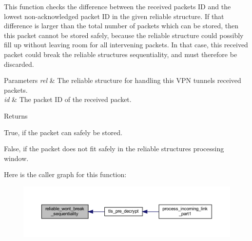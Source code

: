 This function checks the difference between the received packet\textquotesingle{}s I\+D and the lowest non-\/acknowledged packet I\+D in the given reliable structure. If that difference is larger than the total number of packets which can be stored, then this packet cannot be stored safely, because the reliable structure could possibly fill up without leaving room for all intervening packets. In that case, this received packet could break the reliable structure\textquotesingle{}s sequentiality, and must therefore be discarded.


\begin{DoxyParams}{Parameters}
{\em rel} & The reliable structure for handling this V\+P\+N tunnel\textquotesingle{}s received packets. \\
\hline
{\em id} & The packet I\+D of the received packet.\\
\hline
\end{DoxyParams}
\begin{DoxyReturn}{Returns}
\begin{DoxyItemize}
\item True, if the packet can safely be stored. \item False, if the packet does not fit safely in the reliable structure\textquotesingle{}s processing window. \end{DoxyItemize}

\end{DoxyReturn}


Here is the caller graph for this function\+:
\nopagebreak
\begin{figure}[H]
\begin{center}
\leavevmode
\includegraphics[width=350pt]{group__reliable_gad2d6e3bde9beced3d69bbba652730439_icgraph}
\end{center}
\end{figure}


